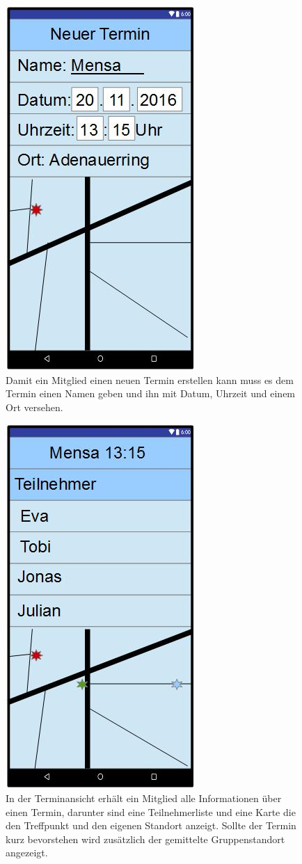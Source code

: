 \documentclass{scrartcl}
\begin{document}
	\newpage
	\begin{figure}[h]
		\centering
		\includegraphics[width=.5\textwidth]{GUI_NeuerTermin.jpg}
		\caption{Damit ein Mitglied einen neuen Termin erstellen kann muss es dem Termin einen Namen geben und ihn mit Datum, Uhrzeit und einem Ort versehen.}
	\end{figure}
	
	\newpage
	\begin{figure}[h]
		\centering
		\includegraphics[width=.5\textwidth]{GUI_Termin.jpg}
		\caption{In der Terminansicht erhält ein Mitglied alle Informationen über einen Termin, darunter sind eine Teilnehmerliste und eine Karte die den Treffpunkt und den eigenen Standort anzeigt. Sollte der Termin kurz bevorstehen wird zusätzlich der gemittelte Gruppenstandort angezeigt.}
	\end{figure}
	
\end{document}
